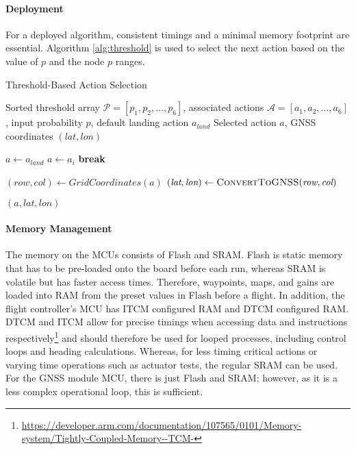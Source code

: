 \paragraph{Deployment}
For a deployed algorithm, consistent timings and a minimal memory footprint are essential. Algorithm \ref{alg:threshold} is used to select the next action based on the value of $p$ and the node $p$ ranges.
\begin{algorithm}[htbp]
  \caption{Threshold-Based Action Selection}
  \label{alg:threshold}
  \begin{algorithmic}[1]
    \Require Sorted threshold array \(\mathcal{P} = [p_1, p_2, \dots, p_6]\), associated actions \(\mathcal{A} = [a_1, a_2, \dots, a_6]\), input probability \(p\), default landing action \(a_{\textit{land}}\)
    \Ensure Selected action \(a\), GNSS coordinates \((\textit{lat}, \textit{lon})\)
    
    \State \(a \gets a_{\textit{land}}\) 
        \State \(a \gets a_i\)
        \State \textbf{break}
      \EndIf
    \EndFor
    
    \State \((\textit{row}, \textit{col}) \gets \textit{GridCoordinates}(a)\)
    \State \((\textit{lat}, \textit{lon}) \gets \Call{ConvertToGNSS}{\textit{row}, \textit{col}}\)
    
    \State \Return \((a, \textit{lat}, \textit{lon})\)
  \end{algorithmic}
\end{algorithm}
\paragraph{Memory Management}
The memory on the \gls{MCU}s consists of Flash and \gls{SRAM}. Flash is static memory that has to be pre-loaded onto the board before each run, whereas \gls{SRAM} is volatile but has faster access times. Therefore, waypoints, maps, and gains are loaded into \gls{RAM} from the preset values in Flash before a flight. In addition, the flight controller's \gls{MCU} has \gls{ITCM} configured \gls{RAM} and \gls{DTCM} configured \gls{RAM}. \gls{DTCM} and \gls{ITCM} allow for precise timings when accessing data and instructions respectively\footnote{\url{https://developer.arm.com/documentation/107565/0101/Memory-system/Tightly-Coupled-Memory--TCM-}} and should therefore be used for looped processes, including control loops and heading calculations. Whereas, for less timing critical actions or varying time operations such as actuator tests, the regular \gls{SRAM} can be used. For the \gls{GNSS} module \gls{MCU}, there is just Flash and \gls{SRAM}; however, as it is a less complex operational loop, this is sufficient. 

